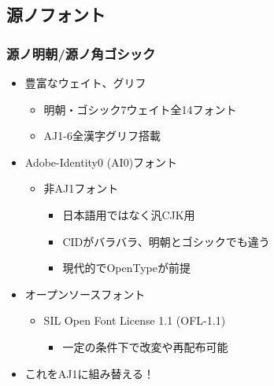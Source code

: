 \subsection{源ノフォント}
\begin{frame}\frametitle{源ノ明朝/源ノ角ゴシック}
  \begin{itemize}
  \item 豊富なウェイト、グリフ
    \begin{itemize}
    \item 明朝・ゴシック7ウェイト全14フォント
    \item AJ1-6全漢字グリフ搭載
    \end{itemize}
  \item Adobe-Identity0 (AI0)フォント
    \begin{itemize}
    \item 非AJ1フォント
      \begin{itemize}
      \item 日本語用ではなく汎CJK用
      \item CIDがバラバラ、明朝とゴシックでも違う
      \item 現代的でOpenTypeが前提
      \end{itemize}
    \end{itemize}
  \item オープンソースフォント
    \begin{itemize}
    \item SIL Open Font License 1.1 (OFL-1.1)
      \begin{itemize}
      \item 一定の条件下で改変や再配布可能
      \end{itemize}
    \end{itemize}
  \item これをAJ1に組み替える！
  \end{itemize}
\end{frame}

